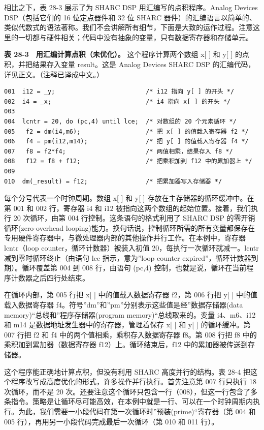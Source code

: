 相比之下，表 28-3 展示了为 SHARC DSP 用汇编写的点积程序。Analog Devices
DSP（包括它们的 16 位定点器件和 32 位 SHARC
器件）的汇编语言以简单的、类似代数式的语法著称。我们不会讲解所有细节，下面是大致的运作过程。注意这里的一切都与硬件相关；代码中没有抽象的变量，只有数据寄存器和存储单元。

\textbf{表 28-3　用汇编计算点积（未优化）。} 这个程序计算两个数组 x{[}
{]} 和 y{[} {]} 的点积，并把结果存入变量 result。这是 Analog Devices
SHARC DSP 的汇编代码，详见正文。（注释已译成中文。）

\begin{verbatim}
001  i12 = _y;                         /* i12 指向 y[ ] 的开头 */
002  i4 = _x;                          /* i4 指向 x[ ] 的开头 */
003
004  lcntr = 20, do (pc,4) until lce;  /* 对数组的 20 个元素循环 */
005   f2 = dm(i4,m6);                  /* 把 x[ ] 的值载入寄存器 f2 */
006   f4 = pm(i12,m14);                /* 把 y[ ] 的值载入寄存器 f4 */
007   f8 = f2*f4;                      /* 两值相乘，结果存入 f8 */
008   f12 = f8 + f12;                  /* 把乘积加到 f12 中的累加器上 */
009
010  dm(_result) = f12;                /* 把累加器写入存储器 */
\end{verbatim}

每个分号代表一个时钟周期。数组 x{[} {]} 和 y{[} {]}
存放在主存储器的循环缓冲中。在第 001 和 002 行，寄存器 i4 和 i12
被指向这两个数组的起始位置。接着，我们执行 20 次循环，由第 004
行控制。这条语句的格式利用了 SHARC DSP 的零开销循环(zero-overhead
looping)能力。换句话说，控制循环所需的所有变量都保存在专用硬件寄存器中，与微处理器内部的其他操作并行工作。在本例中，寄存器
lcntr（loop counter，循环计数器）被装入初值
20，每执行一次循环就减一。lcntr 减到零时循环终止（由语句 lce
指示，意为''loop counter expired''，循环计数器到期）。循环覆盖第 004 到
008 行，由语句 (pc,4)
控制，也就是说，循环在当前程序计数器之后四行处结束。

在循环内部，第 005 行把 x{[} {]} 中的值载入数据寄存器 f2，第 006 行把
y{[} {]} 中的值载入数据寄存器
f4。符号''dm''和''pm''分别表示这些值是经''数据存储器(data
memory)``总线和''程序存储器(program memory)``总线取来的。变量
i4、m6、i12 和 m14 是数据地址发生器中的寄存器，管理着保存 x{[} {]} 和
y{[} {]} 的循环缓冲。第 007 行把 f2 和 f4
中的两个值相乘，乘积存入数据寄存器 f8。第 008 行把 f8
中的乘积加到累加器（数据寄存器 f12）上。循环结束后，f12
中的累加器被传送到存储器。

这个程序能正确地计算点积，但没有利用 SHARC 高度并行的结构。表 28-4
把这个程序改写成高度优化的形式，许多操作并行执行。首先注意第 007
行只执行 18 次循环，而不是 20
次。还要注意这个循环只包含一行（008），但这一行包含了多条指令。策略是让循环尽可能高效，在本例中就是一行、可以在一个时钟周期内执行。为此，我们需要一小段代码在第一次循环时''预装(prime)``寄存器（第
004 和 005 行），再用另一小段代码完成最后一次循环（第 010 和 011 行）。

